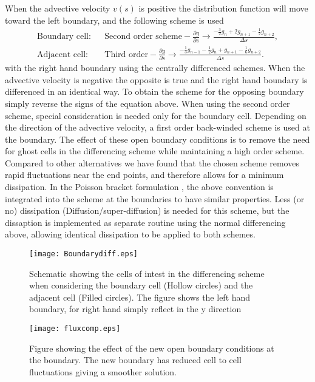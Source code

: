 When the advective velocity $v(s)$ is positive the distribution function will move toward the left boundary, and the 
following scheme is used
\begin{eqnarray}
\mbox{Boundary cell}: & & \mbox{Second order scheme} - \frac{\partial g}{\partial s} \rightarrow \frac{-\frac{3}{2}g_{n} + 2g_{n+1} -\frac{1}{2}g_{n+2}}{\Delta s},\nonumber\\
\mbox{Adjacent cell}: & & \mbox{Third order} - \frac{\partial g}{\partial s} \rightarrow \frac{-\frac{1}{3}g_{n-1} -\frac{1}{2}g_{n} + g_{n+1} - \frac{1}{6}g_{n+2}}{\Delta s}. \nonumber
\end{eqnarray}
with the right hand boundary using the centrally differenced schemes.  
When the advective velocity is negative the opposite is true and the right hand boundary is differenced in an identical way.  
To obtain the scheme for the opposing boundary simply reverse the signs of the equation above.
When using the second order scheme, special consideration is needed only for the boundary cell.  
Depending on the direction of the advective velocity, a first order back-winded scheme is used at the boundary. 
The effect of these open boundary conditions is to remove the need for ghost cells in the differencing scheme while maintaining 
a high order scheme. 
Compared to other alternatives we have found that the chosen scheme removes rapid fluctuations near the end points, and 
therefore allows for a minimum dissipation. In the Poisson bracket formulation , the above convention is integrated into the scheme at the boundaries to have similar properties. Less (or no) dissipation (Diffusion/super-diffusion) is needed for this scheme, but the dissaption is implemented as separate routine using the normal differencing above, allowing identical dissipation to be applied to both schemes.

\begin{figure}
\begin{center}
\texttt{[image: Boundarydiff.eps]}
\caption{Schematic showing the cells of intest in the differencing scheme when considering the boundary cell (Hollow circles) and the adjacent cell (Filled circles).  The figure shows the left hand boundary, for right hand simply reflect in the y direction}
\label{boundarydiffs}
\end{center}
\end{figure}

\begin{figure}
\begin{center}
\texttt{[image: fluxcomp.eps]}
\caption{Figure showing the effect of the new open boundary conditions at the boundary. The new boundary has reduced cell to cell fluctuations giving a smoother solution.}
\label{fluxcomp}
\end{center}
\end{figure}

